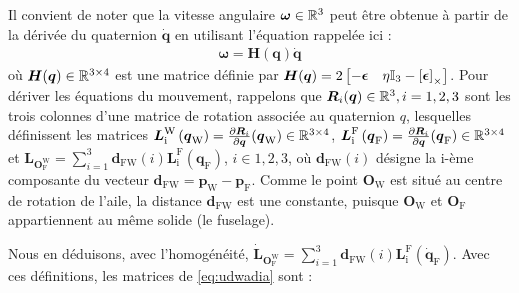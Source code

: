 Il convient de noter que la vitesse angulaire $\boldsymbol{\omega} \in {\mathbb R}^{3}$ peut être obtenue à partir de la dérivée du quaternion $\dot{\boldsymbol{q}}$ en utilisant l'équation \cite[équation (2.7)]{udwadia-schutte} rappelée ici : 
\begin{align*}
    \boldsymbol{\omega} = \boldsymbol{H}(\boldsymbol{q}) \dot{\boldsymbol{q}} 
\end{align*}
où $\boldsymbol{H}(\boldsymbol{q}) \in {\mathbb R}^{3\times4}$ est une matrice définie par $\boldsymbol{H}(\boldsymbol{q}) = 2\begin{bmatrix}-\boldsymbol{\epsilon} & \eta \mathbb{I}_{3} - \left[\boldsymbol{\epsilon}\right]_{\times}\end{bmatrix}$.
Pour dériver les équations du mouvement, rappelons que  $\boldsymbol{R}_{i}(\boldsymbol{q}) \in {\mathbb R}^{3}, i = 1,2,3$ sont les trois colonnes d'une matrice de rotation associée au quaternion $q$, lesquelles définissent les matrices $\boldsymbol{L}_{\text{i}}^{\text{W}} \left( \boldsymbol{q}_{\text{W}} \right) = \frac{\partial \boldsymbol{R}_{i}}{\partial \boldsymbol{q}}(\boldsymbol{q}_{\text{W}}) \in {\mathbb R}^{3\times4}$, 
$\boldsymbol{L}_{\text{i}}^{\text{F}} \left( \boldsymbol{q}_{\text{F}} \right) = \frac{\partial \boldsymbol{R}_{i}}{\partial \boldsymbol{q}}(\boldsymbol{q}_{\text{F}}) \in {\mathbb R}^{3\times4}$ et
$\boldsymbol{L}_{\boldsymbol{O}_{\text{F}}^{\text{W}}} = \sum_{i=1}^{3} \boldsymbol{d}_{\text{FW}}(i) \boldsymbol{L}_{\text{i}}^{\text{F}} (\boldsymbol{q}_{\text{F}})$, $i \in {1,2,3}$, où $\boldsymbol{d}_{\text{FW}}(i)$ désigne la i-ème composante du vecteur $\boldsymbol{d}_{\text{FW}} = \boldsymbol{p}_{\text{W}} - \boldsymbol{p}_{\text{F}}$. Comme le point $\boldsymbol{O}_{\text{W}}$ est situé au centre de rotation de l'aile, la distance $\boldsymbol{d}_{\text{FW}}$ est une constante, puisque $\boldsymbol{O}_{\text{W}}$ et $\boldsymbol{O}_{\text{F}}$ appartiennent au même solide (le fuselage).

Nous en déduisons, avec l'homogénéité, $\dot{\boldsymbol{L}}_{\boldsymbol{O}_{\text{F}}^{\text{W}}} = \sum_{i=1}^{3} \boldsymbol{d}_{\text{FW}}(i) \boldsymbol{L}_{\text{i}}^{\text{F}} (\dot{\boldsymbol{q}}_{\text{F}})$. Avec ces définitions, les matrices de \eqref{eq:udwadia} sont :

